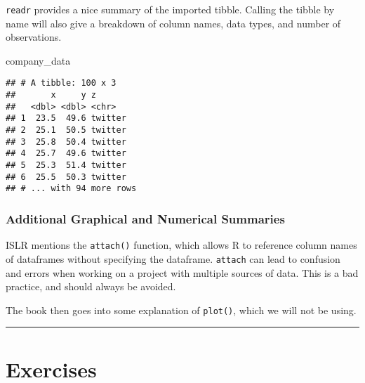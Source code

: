 \documentclass[]{book}
\newenvironment{Shaded}{\begin{snugshade}}{\end{snugshade}}
\newcommand{\NormalTok}[1]{#1}
\theoremstyle{definition}
\theoremstyle{definition}
\theoremstyle{definition}
\theoremstyle{remark}
\begin{document}
\texttt{readr} provides a nice summary of the imported tibble. Calling
the tibble by name will also give a breakdown of column names, data
types, and number of observations.

\begin{Shaded}
\begin{Highlighting}[]
\NormalTok{company_data}
\end{Highlighting}
\end{Shaded}

\begin{verbatim}
## # A tibble: 100 x 3
##       x     y z      
##   <dbl> <dbl> <chr>  
## 1  23.5  49.6 twitter
## 2  25.1  50.5 twitter
## 3  25.8  50.4 twitter
## 4  25.7  49.6 twitter
## 5  25.3  51.4 twitter
## 6  25.5  50.3 twitter
## # ... with 94 more rows
\end{verbatim}

\subsubsection{Additional Graphical and Numerical
Summaries}\label{additional-graphical-and-numerical-summaries}

ISLR mentions the \texttt{attach()} function, which allows R to
reference column names of dataframes without specifying the dataframe.
\texttt{attach} can lead to confusion and errors when working on a
project with multiple sources of data. This is a bad practice, and
should always be avoided.

The book then goes into some explanation of \texttt{plot()}, which we
will not be using.

\begin{center}\rule{0.5\linewidth}{\linethickness}\end{center}

\section{Exercises}\label{exercises}
\end{document}
